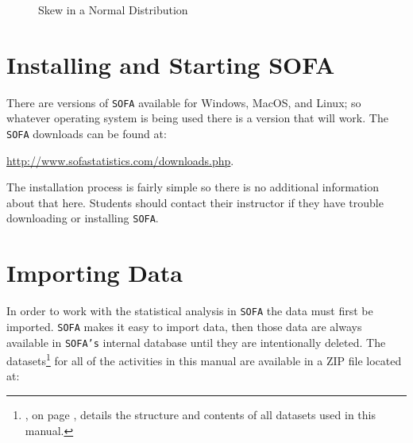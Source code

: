 \begin{figure}[H]
  \begin{center}
  \end{center}
  \caption{Skew in a Normal Distribution}
  \label{int:example_skew}
\end{figure}

\section{Installing and Starting SOFA} 

There are versions of \texttt{SOFA} available for Windows, MacOS, and Linux; so whatever operating system is being used there is a version that will work. The \texttt{SOFA} downloads can be found at:

\url{http://www.sofastatistics.com/downloads.php}. 

The installation process is fairly simple so there is no additional information about that here. Students should contact their instructor if they have trouble downloading or installing \texttt{SOFA}.

\section{Importing Data}

In order to work with the statistical analysis in \texttt{SOFA} the data must first be imported. \texttt{SOFA} makes it easy to import data, then those data are always available in \texttt{SOFA's} internal database until they are intentionally deleted. The datasets\footnote{, on page \pageref{app:a}, details the structure and contents of all datasets used in this manual.} for all of the activities in this manual are available in a ZIP file located at:

